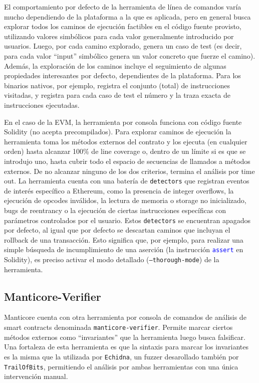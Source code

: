 El comportamiento por defecto de la herramienta de línea de comandos varía mucho dependiendo de la plataforma a la que es aplicada, pero en general busca explorar todos los caminos de ejecución factibles en el código fuente provisto, utilizando valores simbólicos para cada valor generalmente introducido por usuarios.
Luego, por cada camino explorado, genera un caso de test (es decir, para cada valor ``input'' simbólico genera un valor concreto que fuerze el camino).
Además, la exploración de los caminos incluye el seguimiento de algunas propiedades interesantes por defecto, dependientes de la plataforma.
Para los binarios nativos, por ejemplo, registra el conjunto (total) de instrucciones visitadas, y registra para cada caso de test el número y la traza exacta de instrucciones ejecutadas.

En el caso de la EVM, la herramienta por consola funciona con código fuente Solidity (no acepta precompilados).
Para explorar caminos de ejecución la herramienta toma los métodos externos del contrato y los ejecuta (en cualquier orden) hasta alcanzar 100\% de line coverage o, dentro de un límite si es que se introdujo uno, hasta cubrir todo el espacio de secuencias de llamados a métodos externos.
De no alcanzar ninguno de los dos criterios, termina el análisis por time out.
La herramienta cuenta con una batería de \texttt{detectors} que registran eventos de  interés específico a Ethereum, como la presencia de integer overflows, la ejecución de opcodes inválidos, la lectura de memoria o storage no inicializado, bugs de reentrancy o la ejecución de ciertas instrucciones específicas con parámetros controlados por el usuario.
Estos \texttt{detectors} se encuentran apagados por defecto, al igual que por defecto se descartan caminos que incluyan el rollback de una transacción.
Esto significa que, por ejemplo, para realizar una simple búsqueda de incumplimiento de una aserción (la instrucción \textcolor{blue}{\texttt{assert}} en Solidity), es preciso activar el modo detallado (\texttt{--thorough-mode}) de la herramienta.

\subsection{Manticore-Verifier}
Manticore cuenta con otra herramienta por consola de comandos de análisis de smart contracts denominada \texttt{manticore-verifier}.
Permite marcar ciertos métodos externos como ``invariantes'' que la herramienta luego busca falsificar.
Una fortaleza de esta herramienta es que la sintaxis para marcar los invariantes es la misma que la utilizada por \texttt{Echidna}, un fuzzer desarollado también por \texttt{TrailOfBits}, permitiendo el análisis por ambas herramientas con una única intervención manual.

